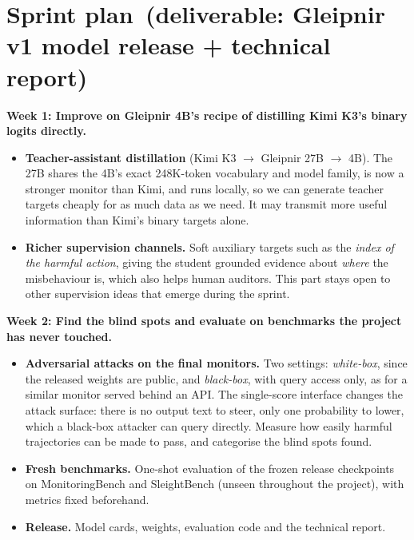 \documentclass[10pt]{article}
\newcommand{\phase}[1]{\textbf{\color{accent}#1}}
\begin{document}
\section{Sprint plan \,(deliverable: Gleipnir v1 model release + technical report)}
\phase{Week 1: Improve on Gleipnir 4B's recipe of distilling Kimi K3's binary logits directly.}
\begin{itemize}
  \item \textbf{Teacher-assistant distillation} (Kimi K3 $\rightarrow$ Gleipnir 27B $\rightarrow$ 4B). The 27B shares the
        4B's exact 248K-token vocabulary and model family, is now a stronger monitor than Kimi, and runs locally, so we
        can generate teacher targets cheaply for as much data as we need. It may transmit more useful information than
        Kimi's binary targets alone.
  \item \textbf{Richer supervision channels.} Soft auxiliary targets such as the \emph{index of the harmful action},
        giving the student grounded evidence about \emph{where} the misbehaviour is, which also helps human auditors.
        This part stays open to other supervision ideas that emerge during the sprint.
\end{itemize}
\phase{Week 2: Find the blind spots and evaluate on benchmarks the project has never touched.}
\begin{itemize}
  \item \textbf{Adversarial attacks on the final monitors.} Two settings: \emph{white-box}, since the released
        weights are public, and \emph{black-box}, with query access only, as for a similar monitor served behind an API.
        The single-score interface changes the attack surface: there is no output text to steer, only one probability to
        lower, which a black-box attacker can query directly. Measure how easily harmful trajectories can be made to pass,
        and categorise the blind spots found.
  \item \textbf{Fresh benchmarks.} One-shot evaluation of the frozen release checkpoints on MonitoringBench and SleightBench
        (unseen throughout the project), with metrics fixed beforehand.
  \item \textbf{Release.} Model cards, weights, evaluation code and the technical report.
\end{itemize}
\end{document}
